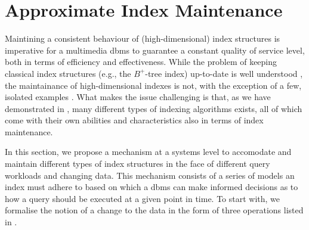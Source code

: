 \section{Approximate Index Maintenance}

Maintining a consistent behaviour of (high-dimensional) index structures is imperative for a multimedia \acrshort{dbms} to guarantee a constant quality of service level, both in terms of efficiency and effectiveness. While the problem of keeping classical index structures (e.g., the $B^{+}$-tree index) up-to-date is well understood \cite{Garcia:2009Database,Petrov:2019Database}, the maintainance of high-dimensional indexes is not, with the exception of a few, isolated examples \cite{Olafsson:2011Dynamic,Hojsgaard:2019Index,Lu:2020VHP}. What makes the issue challenging is that, as we have demonstrated in , many different types of indexing algorithms exists, all of which come with their own abilities and characteristics also in terms of index maintenance. 

In this section, we propose a mechanism at a systems level to accomodate and maintain different types of index structures in the face of different query workloads and changing data. This mechanism consists of a series of models an index must adhere to based on which a \acrshort{dbms} can make informed decisions as to how a query should be executed at a given point in time. To start with, we formalise the notion of a change to the data in the form of three operations listed in .

